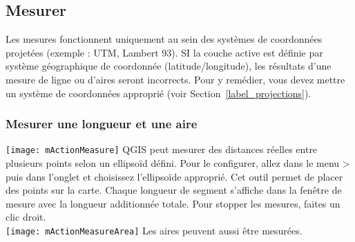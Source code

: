 %

\subsection{Mesurer}\label{sec:measure}

Les mesures fonctionnent uniquement au sein des systèmes de coordonnées projetées (exemple : UTM, Lambert 93). SI la couche active est définie par système géographique de coordonnée (latitude/longitude), les résultats d'une mesure de ligne ou d'aires seront incorrects. Pour y remédier, vous devez mettre un système de coordonnées approprié (voir Section~\ref{label_projections}).


\subsubsection{Mesurer une longueur et une aire}
\texttt{[image: mActionMeasure]} 
QGIS peut mesurer des distances réelles entre plusieurs points selon un ellipsoïd défini. Pour le configurer, allez dans le menu  > puis dans l'onglet  et choisissez l'ellipsoïde approprié. Cet outil permet de placer des points sur la carte. Chaque longueur de segment s'affiche dans la fenêtre de mesure avec la longueur additionnée totale. Pour stopper les mesures, faites un clic droit. \\
\texttt{[image: mActionMeasureArea]} Les aires peuvent aussi être mesurées.

